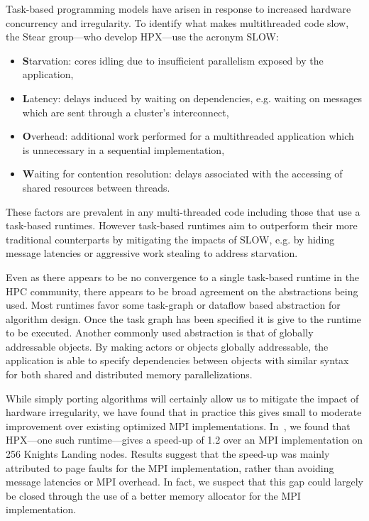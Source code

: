 Task-based programming models have arisen in response to increased hardware concurrency and irregularity. To identify what makes multithreaded code slow, the Ste{\textbar}{\textbar}ar group---who develop HPX---use the acronym SLOW:
\begin{itemize}
\item {\bf S}tarvation: cores idling due to insufficient parallelism exposed by the application,                                                                           
                                                                                      
\item {\bf L}atency: delays induced by waiting on dependencies, e.g. waiting on messages which are sent through a cluster's interconnect,                                  
                                                                                      
\item {\bf O}verhead: additional work performed for a multithreaded application which is unnecessary in a sequential implementation,                                       
                                                                                      
\item {\bf W}aiting for contention resolution: delays associated with the accessing of shared resources between threads.                                                   
\end{itemize}
These factors are prevalent in any multi-threaded code including those that use a task-based runtimes. However task-based runtimes aim to outperform their more traditional counterparts by mitigating the impacts of SLOW, e.g. by hiding message latencies or aggressive work stealing to address starvation.

Even as there appears to be no convergence to a single task-based runtime in the HPC community, there appears to be broad agreement on the abstractions being used. Most runtimes favor some task-graph or dataflow based abstraction for algorithm design. Once the task graph has been specified it is give to the runtime to be executed. Another commonly used abstraction is that of globally addressable objects. By making actors or objects globally addressable, the application is able to specify dependencies between objects with similar syntax for both shared and distributed memory parallelizations.

While simply porting algorithms will certainly allow us to mitigate the impact of hardware irregularity, we have found that in practice this gives small to moderate improvement over existing optimized MPI implementations. 
In~\cite{Bremer2019}, we found that HPX---one such runtime---gives a speed-up of 1.2 over an MPI implementation on 256 Knights Landing nodes. Results suggest that the speed-up was mainly attributed to page faults for the MPI implementation, rather than avoiding message latencies or MPI overhead. In fact, we suspect that this gap could largely be closed through the use of a better memory allocator for the MPI implementation. 

